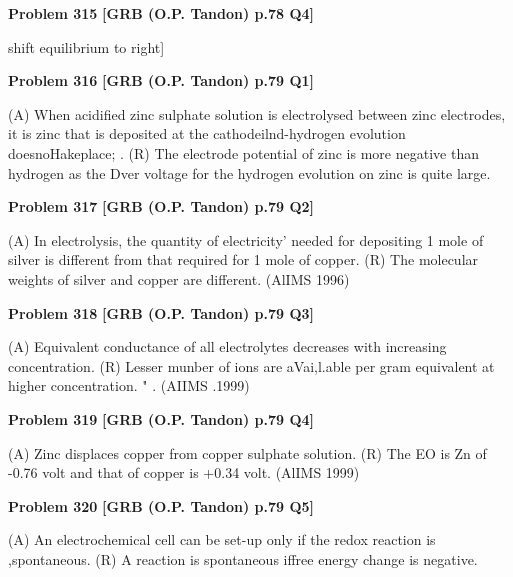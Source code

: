 \begin{problembox}
\textbf{Problem 315} \hfill \textbf{[GRB (O.P. Tandon) p.78 Q4]}
\label{q:ext-grb_all_questions-315}

shift equilibrium to right]
\end{problembox}

\begin{problembox}
\textbf{Problem 316} \hfill \textbf{[GRB (O.P. Tandon) p.79 Q1]}
\label{q:ext-grb_all_questions-316}

(A) When acidified zinc sulphate solution is electrolysed 
between zinc electrodes, it is zinc that is deposited at the 
cathodeilnd-hydrogen evolution doesnoHakeplace; . 
(R) The electrode potential of zinc is more negative than 
hydrogen as the Dver voltage for the hydrogen evolution 
on zinc is quite large.
\end{problembox}

\begin{problembox}
\textbf{Problem 317} \hfill \textbf{[GRB (O.P. Tandon) p.79 Q2]}
\label{q:ext-grb_all_questions-317}

(A) In electrolysis, the quantity of electricity' needed for 
depositing 1 mole of silver is different from that required 
for 1 mole of copper. 
(R) The molecular weights of silver and copper are different. 
(AlIMS 1996)
\end{problembox}

\begin{problembox}
\textbf{Problem 318} \hfill \textbf{[GRB (O.P. Tandon) p.79 Q3]}
\label{q:ext-grb_all_questions-318}

(A) Equivalent conductance of all electrolytes decreases with 
increasing concentration. 
(R) Lesser munber of ions are aVai,l.able per gram equivalent at 
higher concentration. 
" . 
(AIIMS .1999)
\end{problembox}

\begin{problembox}
\textbf{Problem 319} \hfill \textbf{[GRB (O.P. Tandon) p.79 Q4]}
\label{q:ext-grb_all_questions-319}

(A) Zinc displaces copper from copper sulphate solution. 
(R) The EO is Zn of -0.76 volt and that of copper is +0.34 
volt. 
(AlIMS 1999)
\end{problembox}

\begin{problembox}
\textbf{Problem 320} \hfill \textbf{[GRB (O.P. Tandon) p.79 Q5]}
\label{q:ext-grb_all_questions-320}

(A) An electrochemical cell can be set-up only if the redox 
reaction is ,spontaneous. 
(R) A reaction is spontaneous iffree energy change is negative.
\end{problembox}

